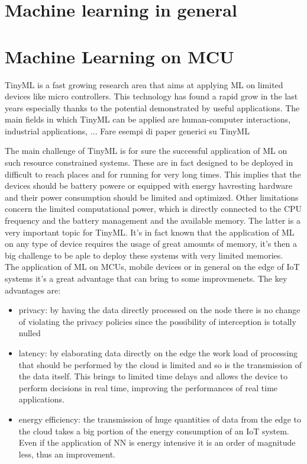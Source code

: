 \documentclass[12pt]{report}
\begin{document}
\section{Machine learning in general}


\section{Machine Learning on MCU}


TinyML is a fast growing research area that aims at applying ML on limited devices like micro controllers. This technology has found a rapid grow in the last years especially thanks to the potential demonstrated by useful applications. The main fields in which TinyML can be applied are human-computer interactions, industrial applications, ... Fare esempi di paper generici su TinyML

The main challenge of TinyML is for sure the successful application of ML on such resource constrained systems. These are in fact designed to be deployed in difficult to reach places and for running for very long times. This implies that the devices should be battery powere or equipped with energy havresting hardware and their power consumption should be limited and optimized. Other limitations concern the limited computational power, which is directly connected to the CPU frequency and the battery management and the available memory. The latter is a very important topic for TinyML. It's in fact known that the application of ML on any type of device requires the usage of great amounts of memory, it's then a big challenge to be aple to deploy these systems with very limited memories.\\
The application of ML on MCUs, mobile devices or in general on the edge of IoT systems it's a great advantage that can bring to some improvmenets. The key advantages are:
\begin{itemize}
\item privacy: by having the data directly processed on the node there is no change of violating the privacy policies since the possibility of interception is totally nulled
\item latency: by elaborating data directly on the edge the work load of processing that should be performed by the cloud is limited and so is the transmission of the data itself. This brings to limited time delays and allows the device to perform decisions in real time, improving the performances of real time applications.
\item energy efficiency: the transmission of huge quantities of data from the edge to the cloud takes a big portion of the energy consumption of an IoT system. Even if the application of NN is energy intensive it is an order of magnitude less, thus an improvement.
\end{itemize}
\end{document}

